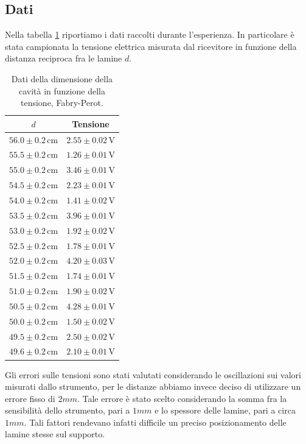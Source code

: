 \documentclass[a4paper]{article}
\begin{document}
\subsection{Dati}
Nella tabella \ref{tab: dati Fabry-Perot} riportiamo i dati raccolti durante l'esperienza. In particolare è stata campionata la tensione elettrica misurata dal ricevitore in funzione della distanza reciproca fra le lamine $d$. 
\begin{table}[H]
\centering
\begin{tabular}{|c|c|}
\hline $d$ & Tensione \\
\hline
$56.0 \pm 0.2\,\text{cm}$ & $2.55 \pm 0.02\,\text{V}$ \\
$55.5 \pm 0.2\,\text{cm}$ & $1.26 \pm 0.01\,\text{V}$ \\
$55.0 \pm 0.2\,\text{cm}$ & $3.46 \pm 0.01\,\text{V}$ \\
$54.5 \pm 0.2\,\text{cm}$ & $2.23 \pm 0.01\,\text{V}$ \\
$54.0 \pm 0.2\,\text{cm}$ & $1.41 \pm 0.02\,\text{V}$ \\
$53.5 \pm 0.2\,\text{cm}$ & $3.96 \pm 0.01\,\text{V}$ \\
$53.0 \pm 0.2\,\text{cm}$ & $1.92 \pm 0.02\,\text{V}$ \\
$52.5 \pm 0.2\,\text{cm}$ & $1.78 \pm 0.01\,\text{V}$ \\
$52.0 \pm 0.2\,\text{cm}$ & $4.20 \pm 0.03\,\text{V}$ \\
$51.5 \pm 0.2\,\text{cm}$ & $1.74 \pm 0.01\,\text{V}$ \\
$51.0 \pm 0.2\,\text{cm}$ & $1.90 \pm 0.02\,\text{V}$ \\
$50.5 \pm 0.2\,\text{cm}$ & $4.28 \pm 0.01\,\text{V}$ \\
$50.0 \pm 0.2\,\text{cm}$ & $1.50 \pm 0.02\,\text{V}$ \\
$49.5 \pm 0.2\,\text{cm}$ & $2.50 \pm 0.02\,\text{V}$ \\
$49.6 \pm 0.2\,\text{cm}$ & $2.10 \pm 0.01\,\text{V}$ \\
\hline
\end{tabular}
\caption{Dati della dimensione della cavità in funzione della tensione, Fabry-Perot.}
\label{tab: dati Fabry-Perot}
\end{table}
Gli errori sulle tensioni sono stati valutati considerando le oscillazioni sui valori misurati dallo strumento, per le distanze abbiamo invece deciso di utilizzare un errore fisso di $2mm$. Tale errore è stato scelto considerando la somma fra la sensibilità dello strumento, pari a $1mm$ e lo spessore delle lamine, pari a circa $1mm$. Tali fattori rendevano infatti difficile un preciso posizionamento delle lamine stesse sul supporto.
\end{document}
